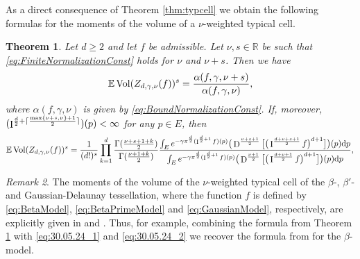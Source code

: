 \documentclass[11pt,a4paper]{article}
\theoremstyle{plain}
\newtheorem{theorem}{Theorem}[section]
\theoremstyle{definition}
\theoremstyle{remark}
\newtheorem{remark}[theorem]{Remark}
\def\EE{\mathbb{E}}
\def\RR{\mathbb{R}}
\newcommand{\dd}{{\rm d}}
\newcommand{\frI}{\mathop{\mathrm{I}}\nolimits}
\newcommand{\frD}{\mathop{\mathrm{D}}\nolimits}
\newcommand{\Vol}{\operatorname{Vol}}
\begin{document}
As a direct consequence of Theorem \ref{thm:typcell} we obtain the following formulas for the moments of the volume of a $\nu$-weighted typical cell.

\begin{theorem}\label{thm:moments}
    Let $d\ge 2$ and let $f$ be admissible. Let $\nu, s\in\RR$ be such that \eqref{eq:FiniteNormalizationConst} holds for $\nu$ and $\nu+s$. Then we have
    \begin{align*}
        \EE \Vol(Z_{d,\gamma,\nu}(f))^s = {\alpha(f,\gamma,\nu+s)\over \alpha (f,\gamma,\nu)},
    \end{align*}
    where $\alpha(f,\gamma,\nu)$ is given by \eqref{eq:BoundNormalizationConst}. If, moreover, $(\frI^{{d\over 2}+\lceil{\max\{\nu+s,\nu\}+1\over 2}\rceil})(p)<\infty$ for any $p\in E$, then 
    \begin{align*}
        \EE \Vol(Z_{d,\gamma,\nu}(f))^s ={1\over (d!)^s}\prod_{k=1}^d{\Gamma({\nu+s+1+k\over 2})\over \Gamma({\nu+1+k\over 2})} {\int_{E}e^{-\gamma\pi^{\frac{d}{2}}(\frI^{\frac{d}{2}+1}f)(p)}\big(\frD^{\frac{\nu+s+1}{2}}\big[\big(\frI^{\frac{d+\nu+s+1}{2}}f\big)^{d+1}\big]\big)(p) \dd p\over \int_{E}e^{-\gamma\pi^{\frac{d}{2}}(\frI^{\frac{d}{2}+1}f)(p)} \big(\frD^{\frac{\nu+1}{2}}\big[\big(\frI^{\frac{d+\nu+1}{2}}f\big)^{d+1}\big]\big)(p) \dd p},
    \end{align*}
\end{theorem}
\begin{remark}
    The moments of the volume of the $\nu$-weighted typical cell of the $\beta$-, $\beta'$- and Gaussian-Delaunay tessellation, where the function $f$ is defined by \eqref{eq:BetaModel}, \eqref{eq:BetaPrimeModel} and \eqref{eq:GaussianModel}, respectively, are explicitly given in \cite[Theorem~5.1]{GKT20} and \cite[Corollary~5.7]{GKT21}. Thus, for example, combining the formula from Theorem \ref{thm:moments} with \eqref{eq:30.05.24_1} and \eqref{eq:30.05.24_2} we recover the formula from \cite[Theorem~5.1]{GKT20} for the $\beta$-model.
\end{remark}
\end{document}
